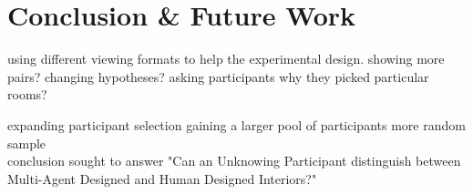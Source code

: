 \section{Conclusion \& Future Work}

using different viewing formats to help the experimental design.
showing more pairs?
changing hypotheses?
asking participants why they picked particular rooms?

expanding participant selection
gaining a larger pool of participants
more random sample
\\
conclusion
sought to answer "Can an Unknowing Participant distinguish between Multi-Agent Designed and Human Designed Interiors?"
